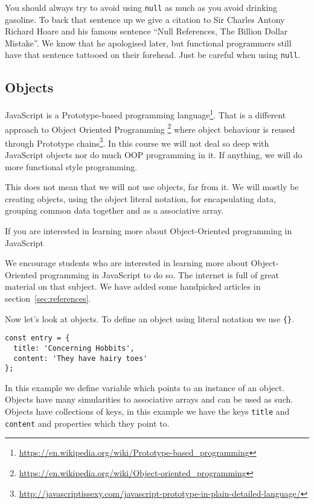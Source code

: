 You should always try to avoid using \texttt{null} as much as you avoid drinking gasoline. To back that sentence up we give a citation to Sir Charles Antony Richard Hoare and his famous sentence ``Null References, The Billion Dollar Mistake''. We know that he apologised later, but functional programmers still have that sentence tattooed on their forehead. Just be careful when using \texttt{null}.

\subsection{Objects}
JavaScript is a Prototype-based programming language\footnote{\url{https://en.wikipedia.org/wiki/Prototype-based_programming}}. That is a different approach to Object Oriented Programming \footnote{\url{https://en.wikipedia.org/wiki/Object-oriented_programming}} where object behaviour is reused through Prototype chains\footnote{\url{http://javascriptissexy.com/javascript-prototype-in-plain-detailed-language/}}. In this course we will not deal so deep with JavaScript objects nor do much OOP programming in it. If anything, we will do more functional style programming.

This does not mean that we will not use objects, far from it. We will mostly be creating objects, using the object literal notation, for encapsulating data, grouping common data together and as a associative array.

If you are interested in learning more about Object-Oriented programming in JavaScript

We encourage students who are interested in learning more about Object-Oriented programming in JavaScript to do so. The internet is full of great material on that subject. We have added some handpicked articles in section~\ref{sec:references}.

Now let's look at objects. To define an object using literal notation we use \texttt{\{\}}.

\begin{lstlisting}
const entry = {
  title: 'Concerning Hobbits',
  content: 'They have hairy toes'
};
\end{lstlisting}

In this example we define variable which points to an instance of an object. Objects have many simularities to associative arrays and can be used as such. Objects have collections of keys, in this example we have the keys \texttt{title} and \texttt{content} and properties which they point to.

